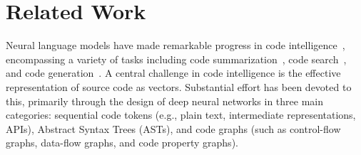 \section{Related Work}
\label{full_related_work}
Neural language models have made remarkable progress in code intelligence~\cite{wan2024deep}, encompassing a variety of tasks including code summarization~\cite{wan2018improving,wang2020reinforcement}, code search~\cite{gu2018deep,wan2019multi}, and code generation~\cite{bi2024iterative,sun2024sifting,li2024ircoco}. A central challenge in code intelligence is the effective representation of source code as vectors. Substantial effort has been devoted to this, primarily through the design of deep neural networks in three main categories: sequential code tokens (e.g., plain text, intermediate representations, APIs), Abstract Syntax Trees (ASTs), and code graphs (such as control-flow graphs, data-flow graphs, and code property graphs).
